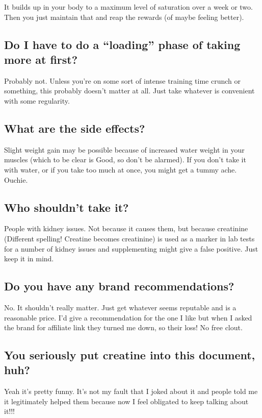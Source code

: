 \documentclass{article}
\begin{document}
It builds up in your body to a maximum level of saturation over a week or two. Then you just maintain that and reap the rewards (of maybe feeling better).

\subsection{Do I have to do a “loading” phase of taking more at first?}

Probably not. Unless you’re on some sort of intense training time crunch or something, this probably doesn’t matter at all. Just take whatever is convenient with some regularity.

\subsection{What are the side effects?}

Slight weight gain may be possible because of increased water weight in your muscles (which to be clear is Good, so don't be alarmed). If you don’t take it with water, or if you take too much at once, you might get a tummy ache. Ouchie.

\subsection{Who shouldn’t take it?}

People with kidney issues. Not because it causes them, but because creatinine (Different spelling! Creatine becomes creatinine) is used as a marker in lab tests for a number of kidney issues and supplementing might give a false positive. Just keep it in mind.

\subsection{Do you have any brand recommendations?}

No. It shouldn’t really matter. Just get whatever seems reputable and is a reasonable price. I’d give a recommendation for the one I like but when I asked the brand for affiliate link they turned me down, so their loss! No free clout.

\subsection{You seriously put creatine into this document, huh?}

Yeah it’s pretty funny. It’s not my fault that I joked about it and people told me it legitimately helped them because now I feel obligated to keep talking about it!!!
\end{document}
